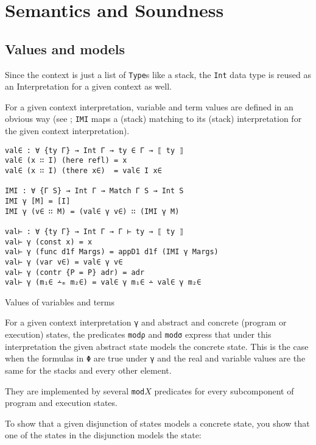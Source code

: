 \section{Semantics and Soundness}
\label{sec:semantics-soundness}

\subsection{Values and models}\label{sec:values&models}

Since the context is just a list of \verb/Type/s like a stack, the \verb/Int/ data type
is reused as an Interpretation for a given context as well.

For a given context interpretation, variable and term values are defined in an obvious way
(see ; \verb/IMI/ maps a (stack) matching to its (stack) interpretation
for the given context interpretation).

\begin{listing}[!ht]
\begin{verbatim}
val∈ : ∀ {ty Γ} → Int Γ → ty ∈ Γ → ⟦ ty ⟧
val∈ (x ∷ I) (here refl) = x
val∈ (x ∷ I) (there x∈)  = val∈ I x∈

IMI : ∀ {Γ S} → Int Γ → Match Γ S → Int S
IMI γ [M] = [I]
IMI γ (v∈ ∷ M) = (val∈ γ v∈) ∷ (IMI γ M)
  
val⊢ : ∀ {ty Γ} → Int Γ → Γ ⊢ ty → ⟦ ty ⟧
val⊢ γ (const x) = x
val⊢ γ (func d1f Margs) = appD1 d1f (IMI γ Margs)
val⊢ γ (var v∈) = val∈ γ v∈
val⊢ γ (contr {P = P} adr) = adr
val⊢ γ (m₁∈ ∸ₘ m₂∈) = val∈ γ m₁∈ ∸ val∈ γ m₂∈
\end{verbatim}
\caption{Values of variables and terms}
\label{values}
\end{listing}

For a given context interpretation \verb/γ/ and abstract and concrete (program or execution) states,
the predicates \verb/modρ/ and \verb/modσ/ express that
under this interpretation the given abstract state models the concrete state.
This is the case when the formulas in \verb/Φ/ are true under \verb/γ/ and
the real and variable values are the same for the stacks and every other element.

They are implemented by several \verb/mod/$X$ predicates for every
subcomponent of program and execution states.

To show that a given disjunction of states models a concrete state,
you show that one of the states in the disjunction models the state:

